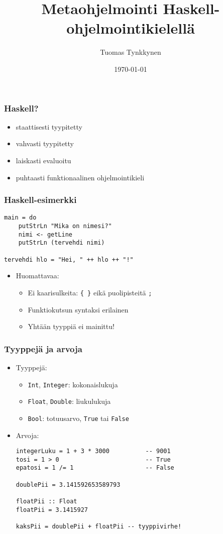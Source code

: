 \documentclass{beamer}
\title{Metaohjelmointi Haskell-ohjelmointikielellä}
\author{Tuomas Tynkkynen}
\institute{Helsingin Yliopisto}
\date{\today}
\begin{document}
\frame{\titlepage}

\begin{frame}
\frametitle{Haskell?}
    \begin{itemize}
        \item{staattisesti tyypitetty}
        \item{vahvasti tyypitetty}
        \item{laiskasti evaluoitu}
        \item{puhtaasti funktionaalinen ohjelmointikieli}
    \end{itemize}
\end{frame}

\begin{frame}[fragile]
\frametitle{Haskell-esimerkki}
\begin{verbatim}
main = do
    putStrLn "Mika on nimesi?"
    nimi <- getLine
    putStrLn (tervehdi nimi)

tervehdi hlo = "Hei, " ++ hlo ++ "!"
\end{verbatim}


\begin{itemize}
\item{Huomattavaa:}
\begin{itemize}
\item{Ei kaarisulkeita: \texttt{\{ \}} eikä puolipisteitä \texttt{;}}
\item{Funktiokutsun syntaksi erilainen}
\item{Yhtään tyyppiä ei mainittu!}
\end{itemize}
\end{itemize}

\end{frame}

\begin{frame}[fragile]
\frametitle{Tyyppejä ja arvoja}
\begin{itemize}
\item{Tyyppejä:}
\begin{itemize}
\item{\texttt{Int}, \texttt{Integer}: kokonaislukuja}
\item{\texttt{Float}, \texttt{Double}: liukulukuja}
\item{\texttt{Bool}: totuusarvo, \texttt{True} tai \texttt{False}}
\end{itemize}
\item{Arvoja:}
\begin{verbatim}
integerLuku = 1 + 3 * 3000          -- 9001
tosi = 1 > 0                        -- True
epatosi = 1 /= 1                    -- False

doublePii = 3.141592653589793

floatPii :: Float
floatPii = 3.1415927

kaksPii = doublePii + floatPii -- tyyppivirhe!
\end{verbatim}
\end{itemize}
\end{frame}
\end{document}
